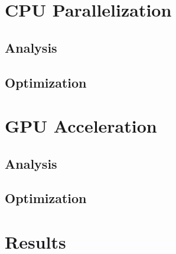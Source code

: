 \documentclass{egpubl}
\begin{document}
\section{CPU Parallelization}

\subsection{Analysis}

\subsection{Optimization}

\section{GPU Acceleration}

\subsection{Analysis}

\subsection{Optimization}

\section{Results}
\end{document}
